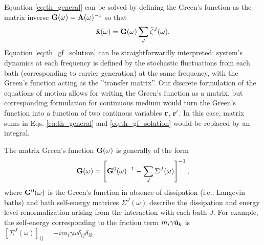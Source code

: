 
Equation \eqref{eq:th_general} can be solved by defining the Green's function as the matrix inverse $\mathbf{G}(\omega)=\mathbf{A}(\omega)^{-1}$ so that  
\begin{equation}
 \tilde{\mathbf{x}}(\omega)  =  \mathbf{G}(\omega) \sum_J \tilde \zeta^J(\omega). \label{eq:th_gf_solution}
\end{equation}
Equation \eqref{eq:th_gf_solution} can be straightforwardly interpreted: system's dynamics at each frequency is defined by the stochastic fluctuations from each bath (corresponding to carrier generation) at the same frequency, with the Green's function acting as the ''transfer matrix''. Our discrete formulation of the equations of motion allows for writing the Green's function as a matrix, but corresponding formulation for continuous medium would turn the Green's function into a function of two continous variables $\mathbf{r}$, $\mathbf{r}'$. In this case, matrix sums in Eqs. \eqref{eq:th_general} and \eqref{eq:th_gf_solution} would be replaced by an integral.

The matrix Green's function $\mathbf{G}(\omega)$ is generally of the form
\begin{equation}
 \mathbf{G}(\omega) = \left[\mathbf{G}^0(\omega)^{-1} - \sum_J \Sigma^J(\omega) \right]^{-1},
\end{equation}
where $\mathbf{G}^0(\omega)$ is the Green's function in absence of dissipation (i.e., Langevin baths) and bath self-energy matrices $\Sigma^J(\omega)$ describe the dissipation and energy level renormalization arising from the interaction with each bath $J$. For example, the self-energy corresponding to the friction term $m_i\gamma \dot{\mathbf{u}}_k$ is $[\Sigma^J(\omega)]_{ij}=-im_i\gamma \omega \delta_{ij} \delta_{ik}$. 

